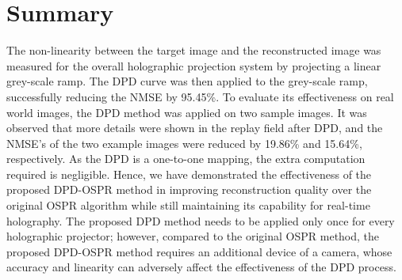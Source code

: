 \section{Summary}
The non-linearity between the target image and the reconstructed image was measured for the overall holographic projection system by projecting a linear grey-scale ramp. The DPD curve was then applied to the grey-scale ramp, successfully reducing the NMSE by 95.45\%. To evaluate its effectiveness on real world images, the DPD method was applied on two sample images. It was observed that more details were shown in the replay field after DPD, and the NMSE's of the two example images were reduced by 19.86\% and 15.64\%, respectively. As the DPD is a one-to-one mapping, the extra computation required is negligible. Hence, we have demonstrated the effectiveness of the proposed DPD-OSPR method in improving reconstruction quality over the original OSPR algorithm while still maintaining its capability for real-time holography. The proposed DPD method needs to be applied only once for every holographic projector; however, compared to the original OSPR method, the proposed DPD-OSPR method requires an additional device of a camera, whose accuracy and linearity can adversely affect the effectiveness of the DPD process.
